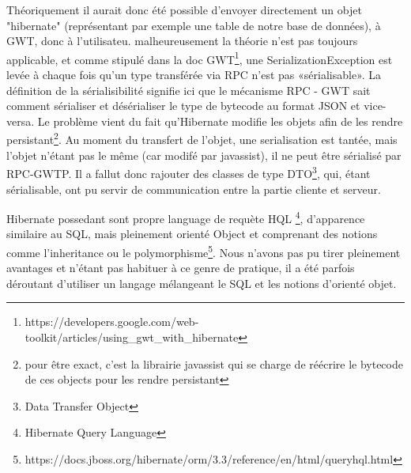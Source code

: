 Théoriquement il aurait donc été possible d'envoyer directement un objet "hibernate" (représentant par exemple une table de notre base de données), à GWT, donc à l'utilisateu. malheureusement la théorie n'est pas toujours applicable, et comme stipulé dans la doc GWT\footnote{https://developers.google.com/web-toolkit/articles/using\_gwt\_with\_hibernate},
une SerializationException est levée à chaque fois qu'un type transférée via RPC n'est pas «sérialisable». La définition de la sérialisibilité signifie ici que le mécanisme RPC - GWT sait comment sérialiser et désérialiser le type de bytecode au format JSON et vice-versa.
Le problème vient du fait qu'Hibernate modifie les objets afin de les rendre persistant\footnote{pour être exact, c'est la librairie javassist qui se charge de réécrire le bytecode de ces objects pour les rendre persistant}. Au moment du transfert de l'objet, une serialisation est tantée, mais l'objet n'étant pas le même (car modifé par javassist), il ne peut être sérialisé par RPC-GWTP.
Il a fallut donc rajouter des classes de type DTO\footnote{Data Transfer Object}, qui, étant sérialisable, ont pu servir de communication entre la partie cliente et serveur.

Hibernate possedant sont propre language de requète HQL \footnote{Hibernate Query Language}, d'apparence similaire au SQL, mais pleinement orienté Object et comprenant des notions comme l'inheritance ou le polymorphisme\footnote{https://docs.jboss.org/hibernate/orm/3.3/reference/en/html/queryhql.html}. Nous n'avons pas pu tirer pleinement avantages et n'étant pas habituer à ce genre de pratique, il a été parfois déroutant d'utiliser un langage mélangeant le SQL et les notions d'orienté objet.

